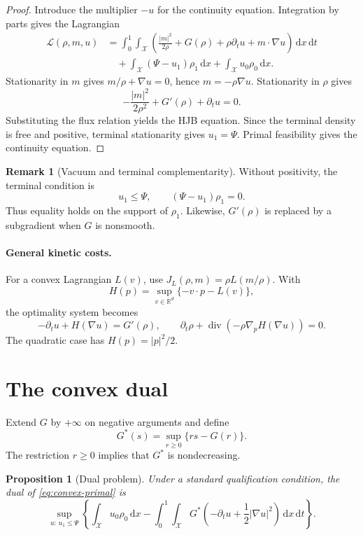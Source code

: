 \documentclass[11pt,a4paper]{article}
\newtheorem{proposition}[theorem]{Proposition}
\theoremstyle{definition}
\newtheorem{remark}[theorem]{Remark}
\newcommand{\RR}{\mathbb R}
\newcommand{\diverg}{\operatorname{div}}
\newcommand{\dd}{\,\mathrm d}
\newcommand{\abs}[1]{\left\lvert#1\right\rvert}
\begin{document}
\begin{proof}
Introduce the multiplier \(-u\) for the continuity equation. Integration by
parts gives the Lagrangian
\begin{align*}
  \mathscr L(\rho,m,u)
  &=
  \int_0^1\!\int_{\mathcal X}
  \left(
    \frac{\abs m^2}{2\rho}+G(\rho)
    +\rho\partial_tu+m\cdot\nabla u
  \right)\dd x\dd t\\
  &\quad
  +\int_{\mathcal X}(\Psi-u_1)\rho_1\dd x
  +\int_{\mathcal X}u_0\rho_0\dd x.
\end{align*}
Stationarity in \(m\) gives \(m/\rho+\nabla u=0\), hence
\(m=-\rho\nabla u\). Stationarity in \(\rho\) gives
\[
  -\frac{\abs m^2}{2\rho^2}+G'(\rho)+\partial_tu=0.
\]
Substituting the flux relation yields the HJB equation. Since the terminal
density is free and positive, terminal stationarity gives \(u_1=\Psi\).
Primal feasibility gives the continuity equation.
\end{proof}

\begin{remark}[Vacuum and terminal complementarity]
Without positivity, the terminal condition is
\[
  u_1\leq\Psi,\qquad(\Psi-u_1)\rho_1=0.
\]
Thus equality holds on the support of \(\rho_1\). Likewise, \(G'(\rho)\) is
replaced by a subgradient when \(G\) is nonsmooth.
\end{remark}

\paragraph{General kinetic costs.}
For a convex Lagrangian \(L(v)\), use
\(J_L(\rho,m)=\rho L(m/\rho)\). With
\[
  H(p)=\sup_{v\in\RR^d}\{-v\cdot p-L(v)\},
\]
the optimality system becomes
\begin{equation}\label{eq:general-mfg-system}
  -\partial_tu+H(\nabla u)=G'(\rho),
  \qquad
  \partial_t\rho+\diverg\left(-\rho\nabla_pH(\nabla u)\right)=0.
\end{equation}
The quadratic case has \(H(p)=|p|^2/2\).

\section{The convex dual}

Extend \(G\) by \(+\infty\) on negative arguments and define
\[
  G^*(s)=\sup_{r\geq0}\{rs-G(r)\}.
\]
The restriction \(r\geq0\) implies that \(G^*\) is nondecreasing.

\begin{proposition}[Dual problem]
\label{prop:variational-mfg-dual}
Under a standard qualification condition, the dual of
\eqref{eq:convex-primal} is
\begin{equation}\label{eq:variational-mfg-dual}
  \sup_{u:\,u_1\leq\Psi}
  \left\{
    \int_{\mathcal X}u_0\rho_0\dd x
    -
    \int_0^1\!\int_{\mathcal X}
      G^*\left(-\partial_tu+\frac12\abs{\nabla u}^2\right)\dd x\dd t
  \right\}.
\end{equation}
\end{proposition}
\end{document}
